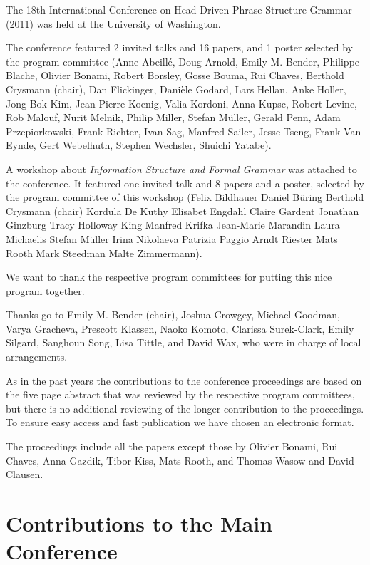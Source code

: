 
The 18th International Conference on Head-Driven Phrase Structure Grammar (2011) was held at the University of Washington.

The conference featured 2 invited talks and 16 papers, and 1 poster selected by the program committee (Anne Abeillé,
Doug Arnold,
Emily M. Bender,
Philippe Blache,
Olivier Bonami,
Robert Borsley,
Gosse Bouma,
Rui Chaves,
Berthold Crysmann (chair),
Dan Flickinger,
Danièle Godard,
Lars Hellan,
Anke Holler,
Jong-Bok Kim,
Jean-Pierre Koenig,
Valia Kordoni,
Anna Kupsc,
Robert Levine,
Rob Malouf,
Nurit Melnik,
Philip Miller,
Stefan Müller,
Gerald Penn,
Adam Przepiorkowski,
Frank Richter,
Ivan Sag,
Manfred Sailer,
Jesse Tseng,
Frank Van Eynde,
Gert Webelhuth,
Stephen Wechsler,
Shuichi Yatabe).

A workshop about \emph{Information Structure and Formal Grammar}
was attached to the conference. It featured one invited talk and 8 papers and a poster, selected by the program
committee of this workshop (Felix Bildhauer
Daniel Büring
Berthold Crysmann (chair)
Kordula De Kuthy
Elisabet Engdahl
Claire Gardent
Jonathan Ginzburg
Tracy Holloway King
Manfred Krifka
Jean-Marie Marandin
Laura Michaelis
Stefan Müller
Irina Nikolaeva
Patrizia Paggio
Arndt Riester
Mats Rooth
Mark Steedman
Malte Zimmermann).

We want to thank the respective program committees for putting this nice program together.



Thanks go to Emily M. Bender (chair), Joshua Crowgey,
Michael Goodman,
Varya Gracheva,
Prescott Klassen,
Naoko Komoto,
Clarissa Surek-Clark,
Emily Silgard,
Sanghoun Song,
Lisa Tittle, and David Wax, who were in charge of local arrangements.


As in the past years the contributions to the conference proceedings are based on the five page abstract
that was reviewed by the respective program committees, but there is no additional reviewing of the
longer contribution to the proceedings.
To ensure easy access and fast publication we have chosen an electronic format.


The proceedings include all the papers except those by Olivier Bonami, Rui Chaves, Anna Gazdik,
Tibor Kiss, Mats Rooth, and Thomas Wasow and David Clausen.



\newpage
\part{Contributions to the Main Conference}

